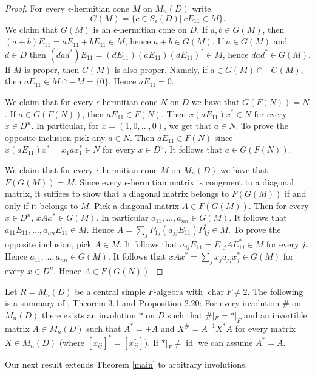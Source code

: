 \documentclass[12pt,reqno]{amsart}
\theoremstyle{definition}
\providecommand{\eps}{\epsilon}
\DeclareMathOperator{\id}{id}
\DeclareMathOperator{\cha}{char}
\begin{document}
\begin{proof}
For every $\eps$-hermitian cone $M$ on $M_n(D)$ write 
\[
G(M) = \{c \in S_\eps(D) \vert \ cE_{11} \in M\}.
\]
We claim that $G(M)$ is an $\eps$-hermitian cone on $D$.
If $a,b \in G(M)$, then $(a+b)E_{11}=aE_{11}+bE_{11} \in M$, hence $a+b \in G(M)$.
If $a \in G(M)$ and $d \in D$ then $(dad^\ast)E_{11}=(dE_{11})(aE_{11})(dE_{11})^\ast \in M$,
hence $dad^\ast \in G(M)$. If $M$ is proper, then $G(M)$ is also proper. Namely, if 
$a \in G(M) \cap -G(M)$, then $aE_{11} \in M \cap -M = \{0\}$. Hence $aE_{11}=0$.

We claim that for every $\eps$-hermitian cone $N$ on $D$ we have that $G(F(N)) = N$.
If $a \in G(F(N))$, then $aE_{11} \in F(N)$. Then $x(aE_{11})x^\ast \in N$ for every
$x \in D^n$. In particular, for $x = (1,0,\ldots,0)$, we get that $a \in N$.
To prove the opposite inclusion pick any $a \in N$. Then $aE_{11} \in F(N)$
since $x(aE_{11})x^\ast = x_1 a x_1^\ast \in N$ for every $x \in D^n$.
It follows that $a \in G(F(N))$.

We claim that for every $\eps$-hermitian cone $M$ on $M_n(D)$ we have that $F(G(M)) = M$.
Since every $\eps$-hermitian matrix is congruent to a diagonal matrix, it suffices to show that
a diagonal matrix belongs to $F(G(M))$ if and only if it belongs to $M$.
Pick a diagonal matrix $A \in F(G(M))$. Then for every $x \in D^n$, $xAx^\ast \in G(M)$.
In particular $a_{11},\ldots,a_{nn} \in G(M)$. It follows that 
$a_{11}E_{11},\ldots,a_{nn}E_{11} \in M$. Hence 
$A = \sum_j P_{1j}(a_{jj}E_{11})P_{1j}^\ast \in M$.
To prove the opposite inclusion, pick $A \in M$. It follows that 
$a_{jj}E_{11} = E_{1j}AE_{1j}^\ast \in M$ for every $j$.
Hence $a_{11},\ldots,a_{nn} \in G(M)$. It follows that
$xAx^\ast = \sum_j x_j a_{jj} x_j^\ast \in G(M)$ for every
$x \in D^n$. Hence $A \in F(G(N))$.
\end{proof}

Let $R=M_n(D)$ be a central simple $F$-algebra with $\cha F \ne 2$. The following is a summary
of \cite{invo}, Theorem 3.1 and Proposition 2.20: For every involution $\#$ on $M_n(D)$ there exists  
an involution $\ast$ on $D$ such that  $\# |_F = \ast|_F$ and an invertible matrix $A \in M_n(D)$ 
such that $A^\ast=\pm A$ and $X^\# = A^{-1} X^\ast A$ for every matrix $X \in M_n(D)$ 
(where $[x_{ij}]^\ast=[x_{ji}^\ast]$). If $\ast|_F \ne \id$ we can assume $A^\ast=A$.

Our next result extends Theorem \ref{main} to arbitrary involutions.
\end{document}
